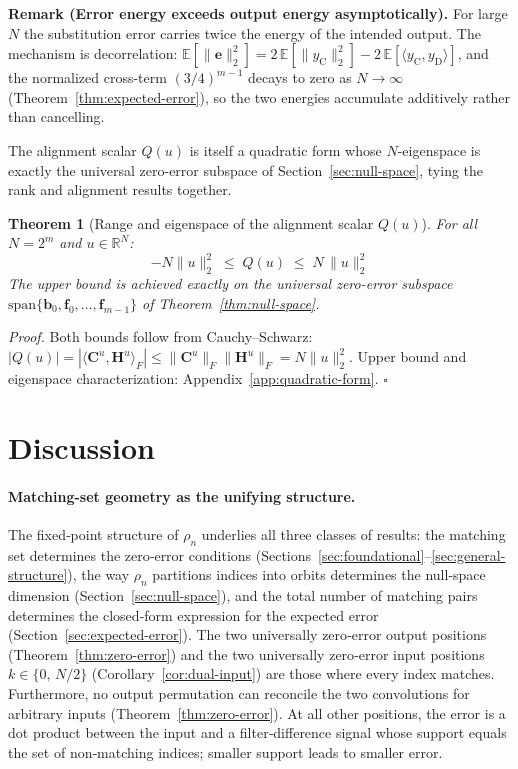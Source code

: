\documentclass[11pt]{article}
\newtheorem{theorem}{Theorem}
\begin{document}
\medskip
\noindent\textbf{Remark (Error energy exceeds output energy asymptotically).} For large $N$ the substitution error carries twice the energy of the intended output. The mechanism is decorrelation: $\mathbb{E}[\|\mathbf{e}\|_2^2] = 2\,\mathbb{E}[\|y_{\mathrm{C}}\|_2^2] - 2\,\mathbb{E}[\langle y_{\mathrm{C}}, y_{\mathrm{D}}\rangle]$, and the normalized cross-term $(3/4)^{m-1}$ decays to zero as $N\to\infty$ (Theorem~\ref{thm:expected-error}), so the two energies accumulate additively rather than cancelling.

\medskip
\noindent The alignment scalar $Q(u)$ is itself a quadratic form whose $N$-eigenspace is exactly the universal zero-error subspace of Section~\ref{sec:null-space}, tying the rank and alignment results together.

\medskip
\begin{theorem}[Range and eigenspace of the alignment scalar $Q(u)$]\label{thm:lambda-max}
For all $N = 2^m$ and $u \in \mathbb{R}^N$:
\begin{equation}
    -N\|u\|_2^2 \;\leq\; Q(u) \;\leq\; N\,\|u\|_2^2
\end{equation}
The upper bound is achieved exactly on the universal zero-error subspace $\mathrm{span}\{\mathbf{b}_0, \mathbf{f}_0, \ldots, \mathbf{f}_{m-1}\}$ of Theorem~\ref{thm:null-space}.
\end{theorem}

\noindent\textit{Proof.} Both bounds follow from Cauchy--Schwarz: $|Q(u)| = |\langle\mathbf{C}^u,\mathbf{H}^u\rangle_F| \leq \|\mathbf{C}^u\|_F\|\mathbf{H}^u\|_F = N\|u\|_2^2$. Upper bound and eigenspace characterization: Appendix~\ref{app:quadratic-form}. $\square$

\section{Discussion}

\paragraph{Matching-set geometry as the unifying structure.}
The fixed‑point structure of $\rho_n$ underlies all three classes of results: the matching set determines the zero‑error conditions (Sections~\ref{sec:foundational}–\ref{sec:general-structure}), the way $\rho_n$ partitions indices into orbits determines the null‑space dimension (Section~\ref{sec:null-space}), and the total number of matching pairs determines the closed‑form expression for the expected error (Section~\ref{sec:expected-error}). The two universally zero‑error output positions (Theorem~\ref{thm:zero-error}) and the two universally zero‑error input positions $k \in \{0,\,N/2\}$ (Corollary~\ref{cor:dual-input}) are those where every index matches. Furthermore, no output permutation can reconcile the two convolutions for arbitrary inputs (Theorem~\ref{thm:zero-error}). At all other positions, the error is a dot product between the input and a filter‑difference signal whose support equals the set of non‑matching indices; smaller support leads to smaller error.
\end{document}
